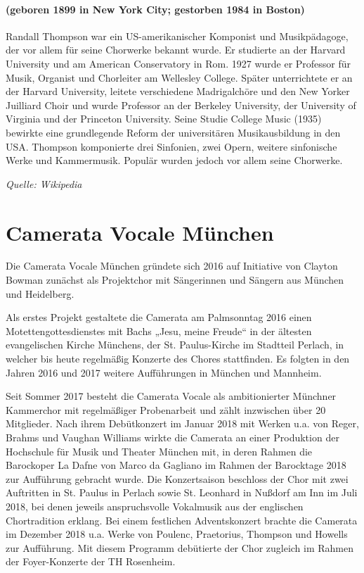 \documentclass[11pt, ngermanm, titlepage]{article}
\begin{document}
\begin{multicols}{2}
	\paragraph{(geboren 1899 in New York City; gestorben 1984 in Boston) \newline}
	Randall Thompson war ein US-amerikanischer Komponist und Musikpädagoge, der vor allem für seine Chorwerke bekannt wurde. Er studierte an der Harvard University und am American Conservatory in Rom. 1927 wurde er Professor für Musik, Organist und Chorleiter am Wellesley College. Später unterrichtete er an der Harvard University, leitete verschiedene Madrigalchöre und den New Yorker Juilliard Choir und wurde Professor an der Berkeley University, der University of Virginia und der Princeton University. Seine Studie College Music (1935) bewirkte eine grundlegende Reform der universitären Musikausbildung in den USA. Thompson komponierte drei Sinfonien, zwei Opern, weitere sinfonische Werke und Kammermusik. Populär wurden jedoch vor allem seine Chorwerke.
	
	\textit{Quelle: Wikipedia}
	\vfill
	\pagebreak
	
	\section*{Camerata Vocale München}
	Die Camerata Vocale München gründete sich 2016 auf Initiative von Clayton Bowman zunächst als Projektchor mit Sängerinnen und Sängern aus München und Heidelberg.
	
	Als erstes Projekt gestaltete die Camerata am Palmsonntag 2016 einen Motettengottesdienstes mit Bachs „Jesu, meine Freude“ in der ältesten evangelischen Kirche Münchens, der St. Paulus-Kirche im Stadtteil Perlach, in welcher bis heute regelmäßig Konzerte des Chores stattfinden. Es folgten in den Jahren 2016 und 2017 weitere Aufführungen in München und Mannheim.
	
	Seit Sommer 2017 besteht die Camerata Vocale als ambitionierter Münchner Kammerchor mit regelmäßiger Probenarbeit und zählt inzwischen über 20 Mitglieder. Nach ihrem Debütkonzert im Januar 2018 mit Werken u.a. von Reger, Brahms und Vaughan Williams wirkte die Camerata an einer Produktion der Hochschule für Musik und Theater München mit, in deren Rahmen die Barockoper La Dafne von Marco da Gagliano im Rahmen der Barocktage 2018 zur Aufführung gebracht wurde. Die Konzertsaison beschloss der Chor mit zwei Auftritten in St. Paulus in Perlach sowie St. Leonhard in Nußdorf am Inn im Juli 2018, bei denen jeweils anspruchsvolle Vokalmusik aus der englischen Chortradition erklang.  Bei einem festlichen Adventskonzert brachte die Camerata im Dezember 2018 u.a. Werke von Poulenc, Praetorius, Thompson und Howells zur Aufführung. Mit diesem Programm debütierte der Chor zugleich im Rahmen der Foyer-Konzerte der TH Rosenheim.
	

\end{multicols}
\end{document}
